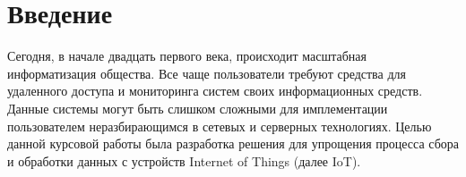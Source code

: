 
\section{Введение}
Сегодня, в начале двадцать первого века, происходит масштабная информатизация общества.
Все чаще пользователи требуют средства для удаленного доступа и мониторинга систем своих 
информационных средств. Данные системы могут быть слишком сложными для имплементации
пользователем неразбирающимся в сетевых и серверных технологиях.
Целью данной курсовой работы была разработка решения для упрощения 
процесса сбора и обработки данных с устройств Internet of Things (далее IoT). 
